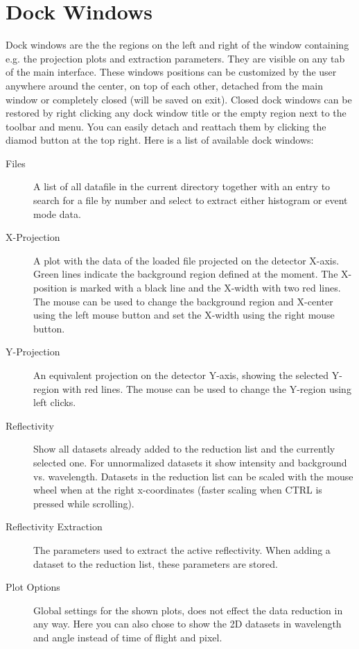 \section{Dock Windows}
  Dock windows are the the regions on the left and right of the window containing e.g. the projection plots and extraction parameters. They are visible on any tab of the main interface.
  These windows positions can be customized by the user anywhere around the center, on top of each other, detached from the main window or completely closed (will be saved on exit). Closed dock windows can be restored by right clicking any dock window title or the empty region next to the toolbar and menu. You can easily detach and reattach them by clicking the diamod button at the top right.
  Here is a list of available dock windows:
  
  \begin{description}
   \item[Files] A list of all datafile in the current directory together with an entry to search for a file by number and select to extract either histogram or event mode data.
   
   \item[X-Projection] A plot with the data of the loaded file projected on the detector X-axis. Green lines indicate the background region defined at the moment. The X-position is marked with a black line and the X-width with two red lines. The mouse can be used to change the background region and X-center using the left mouse button and set the X-width using the right mouse button.
   \item[Y-Projection] An equivalent projection on the detector Y-axis, showing the selected Y-region with red lines. The mouse can be used to change the Y-region using left clicks.
   
   \item[Reflectivity] Show all datasets already added to the reduction list and the currently selected one. For unnormalized datasets it show intensity and background vs. wavelength. Datasets in the reduction list can be scaled with the mouse wheel when at the right x-coordinates (faster scaling when CTRL is pressed while scrolling).
   
   \item[Reflectivity Extraction] The parameters used to extract the active reflectivity. When adding a dataset to the reduction list, these parameters are stored.
   \item[Plot Options] Global settings for the shown plots, does not effect the data reduction in any way. Here you can also chose to show the 2D datasets in wavelength and angle instead of time of flight and pixel.
   

\end{description}
